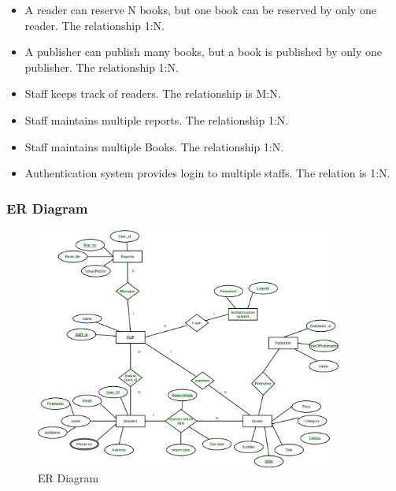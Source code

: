 \begin{itemize}
    \item A reader can reserve N books, but one book can be reserved by
          only one reader. The relationship 1:N.
    \item A publisher can publish many books, but a book is published by
          only one publisher. The relationship 1:N.
    \item Staff keeps track of readers. The relationship is M:N.
    \item Staff maintains multiple reports. The relationship 1:N.
    \item Staff maintains multiple Books. The relationship 1:N.
    \item Authentication system provides login to multiple staffs. The relation is 1:N.

\end{itemize}

\subsubsection{ER Diagram}

\begin{figure}[h]
    \centering
    \includegraphics[width=0.9\textwidth]{res/libraryER.png}
    \caption{ER Diagram}
    \label{fig:er-diagram}
\end{figure}